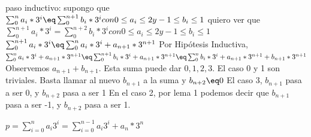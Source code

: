 \documentclass[spanish,12pt]{article}
\begin{document}
paso inductivo:
 supongo que $\sum_{0}^{n}{a_{i}*3^{i}} \eq \sum_{0}^{n+1}{b_{i}*3^{i}} con 0\leq a_{i} \leq 2 y -1 \leq b_{i} \leq 1$
 quiero ver que $\sum_{0}^{n+1}{a_{i}*3^{i}}= \sum_{0}^{n+2}{b_{i}*3^{i}} con 0\leq a_{i} \leq 2 y -1 \leq b_{i} \leq 1$
\\
$\sum_{0}^{n+1}{a_{i}*3^{i}} \eq \sum_{0}^{n}{a_{i}*3^{i}} + a_{n+1}*3^{n+1}$
Por Hipótesis Inductiva, $ \sum_{0}^{n}{a_{i}*3^{i}} + a_{n+1}*3^{n+1} \eq \sum_{0}^{n+1}{b_{i}*3^{i}} + a_{n+1}*3^{n+1} \eq \sum_{0}^{n}{b_{i}*3^{i}} + a_{n+1}*3^{n+1} + b_{n+1}*3^{n+1} $
Observemos $a_{n+1} + b_{n+1}$. Esta suma puede dar $0,1,2,3$.
El caso 0 y 1 son triviales. Basta llamar al nuevo $b_{n+1}$ a la suma y $b_{n+2} \eq 0$
El caso 3, $b_{n+1}$ pasa a ser 0, y $b_{n+2}$ pasa a ser 1
En el caso 2, por lema 1 podemos decir que $b_{n+1}$ pasa a ser -1, y $b_{n+2}$ pasa a ser 1.




$p= \sum_{i=0}^{n}{a_i 3^{i}} =  \sum_{i=0}^{n-1}{a_i 3^{i}} + a_n*3^{n}$ 
\end{document}
